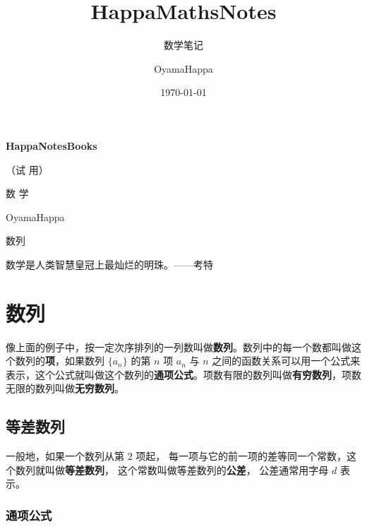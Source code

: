 \documentclass[10pt,cn]{elegantbook}
\title{HappaMathsNotes}
\subtitle{数学笔记}
\author{OyamaHappa}
\date{\today}
\begin{document}
	
	\begin{titlepage}
		\begin{center}
			\vspace*{3cm}
			
			{\Large \textbf{HappaNotesBooks} }
			
			{\Large（试 用）}
			
			\vspace{1cm}
			
			{\Huge 数 \qquad 学}
			
			\vspace{0.5cm}
			
			OyamaHappa
			
			\vspace{1cm}
			
				{\Large 数列 }
			
			\vfill
			
			数学是人类智慧皇冠上最灿烂的明珠。——考特
			
		\end{center}
	\end{titlepage}
	
	
	\tableofcontents
	
	\mainmatter

	\chapter{数列}
	
	像上面的例子中，按一定次序排列的一列数叫做\textbf{数列}。数列中的每一个数都叫做这个数列的\textbf{项}，如果数列 $\{a_n\}$ 的第 $n$ 项 $a_n$ 与 $n$
	之间的函数关系可以用一个公式来表示，这个公式就叫做这个数列的\textbf{通项公式}。项数有限的数列叫做\textbf{有穷数列}，项数无限的数列叫做\textbf{无穷数列}。
	
	\section{等差数列}
	
	一般地，如果一个数列从第 $2$ 项起， 每一项与它的前一项的差等同一个常数，这个数列就叫做\textbf{等差数列}，
	这个常数叫做等差数列的\textbf{公差}， 公差通常用字母 $d$ 表示。 
	
	\subsection{通项公式}
	
\end{document}
